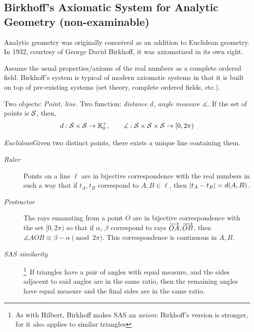 \clearpage


\subsection{Birkhoff's Axiomatic System for Analytic Geometry (non-examinable)}

Analytic geometry was originally conceived as an addition to Euclidean geometry. In 1932, courtesy of George David Birkhoff, it was axiomatized in its own right. %



Assume the usual properties/axioms of the real numbers as a complete ordered field. Birkhoff's system is typical of modern axiomatic systems in that it is built on top of pre-existing systems (set theory, complete ordered fields, etc.).


Two objects: \emph{Point, line.} Two function: \emph{distance $d$, angle measure $\measuredangle$.} If the set of points is $\mathcal{S}$, then,
\[
	d:\mathcal{S}\times\mathcal{S}\to\mathbb{R}^+_0,\qquad \measuredangle:\mathcal{S}\times\mathcal{S}\times\mathcal{S}\to [0,2\pi)
\]



\emph{Euclidean}\lstsp Given two distinct points, there exists a unique line containing them.
\begin{description}%
  \item[\normalfont\emph{Ruler}] Points on a line $\ell$ are in bijective correspondence with the real numbers in such a way that if $t_A,t_B$ correspond to $A,B\in\ell$, then $\left| t_A-t_B\right|=d(A,B)$.
  \item[\normalfont\emph{Protractor}] The rays emanating from a point $O$ are in bijective correspondence with the set $[0,2\pi)$ so that if $\alpha$, $\beta$ correspond to rays $\overrightarrow{OA},\overrightarrow{OB}$, then $\measuredangle AOB\equiv \beta-\alpha\pmod{2\pi}$. This correspondence is continuous in $A,B$.
  \item[\normalfont\emph{SAS similarity}]\!\!\footnote{As with Hilbert, Birkhoff makes SAS an \emph{axiom}: Birkhoff's version is stronger, for it also applies to similar triangles}\, If triangles have a pair of angles with equal measure, and the sides adjacent to said angles are in the same ratio, then the remaining angles have equal measure and the final sides are in the same ratio.
\end{description}

